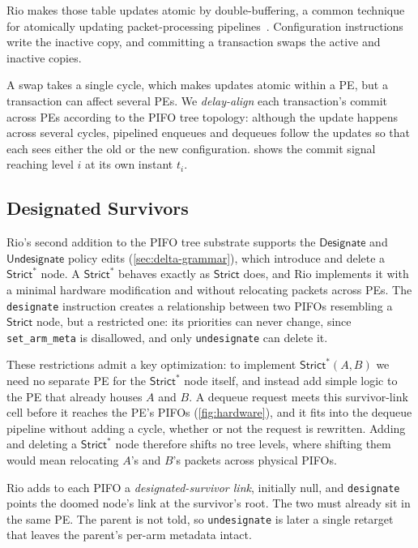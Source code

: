 \documentclass[sigplan,anonymous,review,nonacm]{acmart}
\newcommand{\Strict}{\textsf{Strict}}
\newcommand{\Strictstar}{\textsf{Strict}^{*}}
\newcommand{\Designate}{\textsf{Designate}}
\newcommand{\Undesignate}{\textsf{Undesignate}}
\begin{document}
Rio makes those table updates atomic by double-buffering, a common technique for atomically updating packet-processing pipelines~\cite{Xing22,Yang24}.
Configuration instructions write the inactive copy, and committing a transaction swaps the active and inactive copies.

A swap takes a single cycle, which makes updates atomic within a PE, but a transaction can affect several PEs.
We \emph{delay-align} each transaction's commit across PEs according to the PIFO tree topology:
although the update happens across several cycles, pipelined enqueues and dequeues follow the updates so that each sees either the old or the new configuration.
 shows the commit signal reaching level $i$ at its own instant $t_i$.

\subsection{Designated Survivors}\label{sec:hw-survivor}

Rio's second addition to the PIFO tree substrate supports the $\Designate$ and $\Undesignate$ policy edits (\cref{sec:delta-grammar}), which introduce and delete a $\Strictstar$ node.
A $\Strictstar$ behaves exactly as $\Strict$ does, and Rio implements it with a minimal hardware modification and without relocating packets across PEs.
The \texttt{designate} instruction creates a relationship between two PIFOs resembling a $\Strict$ node, but a restricted one: its priorities can never change, since \texttt{set\_arm\_meta} is disallowed, and only \texttt{undesignate} can delete it.

These restrictions admit a key optimization: to implement $\Strictstar(A, B)$ we need no separate PE for the $\Strictstar$ node itself, and instead add simple logic to the PE that already houses $A$ and $B$.
A dequeue request meets this survivor-link cell before it reaches the PE's PIFOs (\cref{fig:hardware}), and it fits into the dequeue pipeline without adding a cycle, whether or not the request is rewritten.
Adding and deleting a $\Strictstar$ node therefore shifts no tree levels, where shifting them would mean relocating $A$'s and $B$'s packets across physical PIFOs.

Rio adds to each PIFO a \emph{designated-survivor link}, initially null, and \texttt{designate} points the doomed node's link at the survivor's root.
The two must already sit in the same PE.
The parent is not told, so \texttt{undesignate} is later a single retarget that leaves the parent's per-arm metadata intact.
\end{document}
